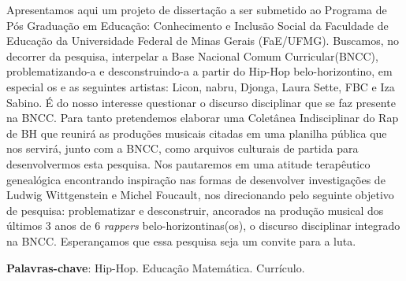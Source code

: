 
\linespread{1}
\setlength{\absparsep}{12pt} %
\begin{resumo}
 Apresentamos aqui um projeto de dissertação a ser submetido ao Programa de Pós Graduação em Educação: Conhecimento e Inclusão Social da Faculdade de 
 Educação da Universidade Federal de Minas Gerais (FaE/UFMG). Buscamos, no decorrer da pesquisa, interpelar a Base Nacional Comum Curricular(BNCC),
 problematizando-a e desconstruindo-a a partir do Hip-Hop belo-horizontino, em especial os e as seguintes artistas: Licon, nabru, Djonga, Laura Sette,
 FBC e Iza Sabino. É do nosso interesse questionar o discurso disciplinar que se faz presente na BNCC. Para tanto pretendemos elaborar uma Coletânea
 Indisciplinar do Rap de BH que reunirá as produções musicais citadas em uma planilha pública que nos servirá, junto com a BNCC, como arquivos culturais
 de partida para desenvolvermos esta pesquisa. Nos pautaremos em uma atitude terapêutico genealógica encontrando inspiração nas formas de desenvolver 
 investigações de Ludwig Wittgenstein e Michel Foucault, nos direcionando pelo seguinte objetivo de pesquisa: problematizar e desconstruir, ancorados 
 na produção musical dos últimos 3 anos de 6 {\em rappers} belo-horizontinas(os), o discurso disciplinar integrado na BNCC. Esperançamos que essa
 pesquisa seja um convite para a luta.

 \textbf{Palavras-chave}: Hip-Hop. Educação Matemática. Currículo.
\end{resumo}


% 

 

  
